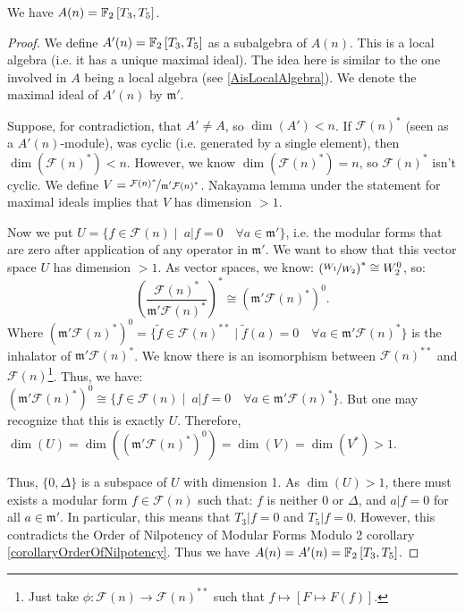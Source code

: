 \begin{property}
	We have $A(n) = \mathbb{F}_2 \left[ T_3, T_5 \right]$.
\end{property}
\begin{proof}
	We define $A'(n) = \mathbb{F}_2 \left[ T_3, T_5 \right]$ as a subalgebra of $A(n)$.
	This is a local algebra (i.e. it has a unique maximal ideal).
	The idea here is similar to the one involved in $A$ being a local algebra (see \ref{AisLocalAlgebra}).
	We denote the maximal ideal of $A'(n)$ by $\mathfrak{m}'$.
	
	Suppose, for contradiction, that $A' \neq A$, so $\dim(A') < n$.
	If $\mathcal{F}(n)^*$ (seen as a $A'(n)$-module), was cyclic (i.e. generated by a single element), then $\dim(\mathcal{F}(n)^*) < n$.
	However, we know $\dim(\mathcal{F}(n)^*)=n$, so $\mathcal{F}(n)^*$ isn't cyclic.
	We define $V=\nicefrac{\mathcal{F}(n)^*}{\mathfrak{m}'\mathcal{F}(n)^*}$.
	Nakayama lemma under the statement for maximal ideals implies that $V$ has dimension $>1$.
	
	
	Now we put $U = \{ f\in \mathcal{F}(n) \mid \ a|f=0 \quad \forall a \in \mathfrak{m}' \}$, i.e. the modular forms that are zero after application of any operator in $\mathfrak{m}'$.
	We want to show that this vector space $U$ has dimension $>1$.
	As vector spaces, we know: $\left( \nicefrac{W_1}{W_2} \right)^* \cong W_2^0$, so:
	$$
	\left( \frac{\mathcal{F}(n)^*}{\mathfrak{m}'\mathcal{F}(n)^*} \right)^* \cong \left( \mathfrak{m}'\mathcal{F}(n)^* \right)^0.
	$$
	Where 
	$
	\left( \mathfrak{m}'\mathcal{F}(n)^* \right)^0 = \{ \tilde{f} \in \mathcal{F}(n)^{**} \mid \tilde{f}(a)=0 \quad \forall a \in \mathfrak{m}'\mathcal{F}(n)^* \}
	$
	is the inhalator of $\mathfrak{m}'\mathcal{F}(n)^*$.
	We know there is an isomorphism between $\mathcal{F}(n)^{**}$ and $\mathcal{F}(n)$\footnote{Just take $\phi: \mathcal{F}(n) \to \mathcal{F}(n)^{**}$ such that $f \mapsto \left[ F \mapsto F(f) \right]$.}.
	Thus, we have:
	$
	\left( \mathfrak{m}'\mathcal{F}(n)^* \right)^0 \cong \{ f \in \mathcal{F}(n) \mid \ a|f=0 \quad \forall a \in \mathfrak{m}'\mathcal{F}(n)^* \}
	$.
	But one may recognize that this is exactly $U$.
	Therefore, 
	$\dim(U) 
	= \dim(\left( \mathfrak{m}'\mathcal{F}(n)^* \right)^0)
	= \dim(V) = \dim(V^*) > 1.
	$
	
	Thus, $\{ 0, \Delta \}$ is a subspace of $U$ with dimension 1.
	As $\dim(U)>1$, there must exists a modular form $f \in \mathcal{F}(n)$ such that:
	$f$ is neither $0$ or $\Delta$, and $a|f=0$ for all $a \in \mathfrak{m}'$.
	In particular, this means that $T_3|f=0$ and $T_5|f=0$.
	However, this contradicts the Order of Nilpotency of Modular Forms Modulo 2 corollary \ref{corollaryOrderOfNilpotency}.
	Thus we have $A(n) = A'(n) = \mathbb{F}_2 \left[ T_3, T_5 \right]$.
\end{proof}

